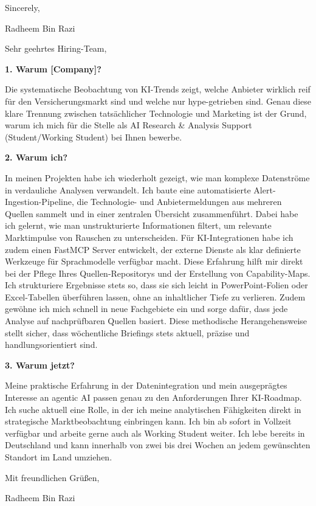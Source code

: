 \documentclass[11pt,a4paper]{coverletter}
\begin{document}
\closing{Sincerely,}{Radheem Bin Razi}

\clearpage
{}


\opening{Sehr geehrtes Hiring-Team,}

\vspace{8pt}\noindent\textbf{1. Warum [Company]?}\par\vspace{3pt}

Die systematische Beobachtung von KI-Trends zeigt, welche Anbieter wirklich reif für den Versicherungsmarkt sind und welche nur hype-getrieben sind. Genau diese klare Trennung zwischen tatsächlicher Technologie und Marketing ist der Grund, warum ich mich für die Stelle als AI Research \& Analysis Support (Student/Working Student) bei Ihnen bewerbe.

\vspace{8pt}\noindent\textbf{2. Warum ich?}\par\vspace{3pt}

In meinen Projekten habe ich wiederholt gezeigt, wie man komplexe Datenströme in verdauliche Analysen verwandelt. Ich baute eine automatisierte Alert-Ingestion-Pipeline, die Technologie- und Anbietermeldungen aus mehreren Quellen sammelt und in einer zentralen Übersicht zusammenführt. Dabei habe ich gelernt, wie man unstrukturierte Informationen filtert, um relevante Marktimpulse von Rauschen zu unterscheiden. Für KI-Integrationen habe ich zudem einen FastMCP Server entwickelt, der externe Dienste als klar definierte Werkzeuge für Sprachmodelle verfügbar macht. Diese Erfahrung hilft mir direkt bei der Pflege Ihres Quellen-Repositorys und der Erstellung von Capability-Maps. Ich strukturiere Ergebnisse stets so, dass sie sich leicht in PowerPoint-Folien oder Excel-Tabellen überführen lassen, ohne an inhaltlicher Tiefe zu verlieren. Zudem gewöhne ich mich schnell in neue Fachgebiete ein und sorge dafür, dass jede Analyse auf nachprüfbaren Quellen basiert. Diese methodische Herangehensweise stellt sicher, dass wöchentliche Briefings stets aktuell, präzise und handlungsorientiert sind.

\vspace{8pt}\noindent\textbf{3. Warum jetzt?}\par\vspace{3pt}

Meine praktische Erfahrung in der Datenintegration und mein ausgeprägtes Interesse an agentic AI passen genau zu den Anforderungen Ihrer KI-Roadmap. Ich suche aktuell eine Rolle, in der ich meine analytischen Fähigkeiten direkt in strategische Marktbeobachtung einbringen kann. Ich bin ab sofort in Vollzeit verfügbar und arbeite gerne auch als Working Student weiter. Ich lebe bereits in Deutschland und kann innerhalb von zwei bis drei Wochen an jedem gewünschten Standort im Land umziehen.

\closing{Mit freundlichen Grüßen,}{Radheem Bin Razi}
\end{document}
